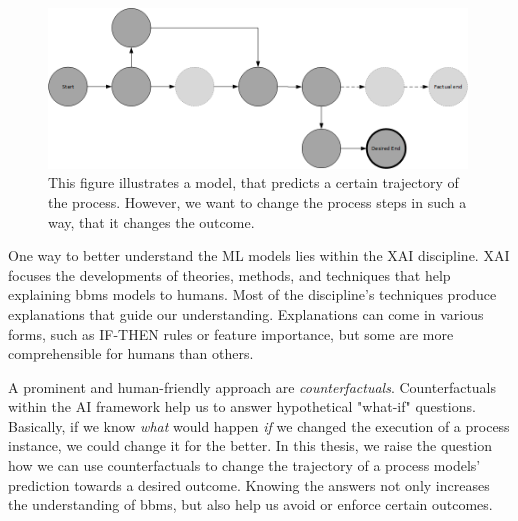 \documentclass[./../../paper.tex]{subfiles}
\begin{document}
\begin{figure}[htb]
    \centering
    \includegraphics[width=0.99\textwidth]{figures/counterfactual_goal.png}
    \caption{This figure illustrates a model, that predicts a certain trajectory of the process. However, we want to change the process steps in such a way, that it changes the outcome.}
    \label{fig:desired_outcome}
\end{figure}

\noindent One way to better understand the \gls{ML} models lies within the \gls{XAI} discipline. XAI focuses the developments of theories, methods, and techniques that help explaining \glspl{bbm} models to humans. Most of the discipline's techniques produce explanations that guide our understanding. Explanations can come in various forms, such as IF-THEN rules\cite[p.90]{molnar2019} or feature importance\cite[p.45]{molnar2019}, but some are more comprehensible for humans than others. 

A prominent and human-friendly approach are \emph{counterfactuals}\cite[p. 221]{molnar2019}. Counterfactuals within the AI framework help us to answer hypothetical "what-if" questions. Basically, if we know \emph{what} would happen \emph{if} we changed the execution of a process instance, we could change it for the better. In this thesis, we raise the question how we can use counterfactuals to change the trajectory of a process models' prediction towards a desired outcome. Knowing the answers not only increases the understanding of \glspl{bbm}, but also help us avoid or enforce certain outcomes. 
\end{document}
